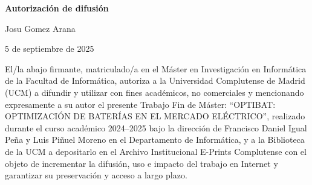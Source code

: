 \newpage

\thispagestyle{empty}

\begin{center}

  {\bf \Huge Autorización de difusión}

  \vspace{1cm}

  \large Josu Gomez Arana

  \vspace{0.5cm}

  5 de septiembre de 2025

  \vspace{0.5cm}

\end{center}

El/la abajo firmante, matriculado/a en el Máster en Investigación en Informática de la Facultad de Informática, autoriza a la Universidad Complutense de Madrid (UCM) a difundir y utilizar con fines académicos, no comerciales y mencionando expresamente a su autor el presente Trabajo Fin de Máster: “OPTIBAT: OPTIMIZACIÓN DE BATERÍAS EN EL MERCADO ELÉCTRICO”, realizado durante el curso académico 2024--2025 bajo la dirección de Francisco Daniel Igual Peña y Luis Piñuel Moreno en el Departamento de Informática, y a la Biblioteca de la UCM a depositarlo en el Archivo Institucional E-Prints Complutense con el objeto de incrementar la difusión, uso e impacto del trabajo en Internet y garantizar su preservación y acceso a largo plazo.
